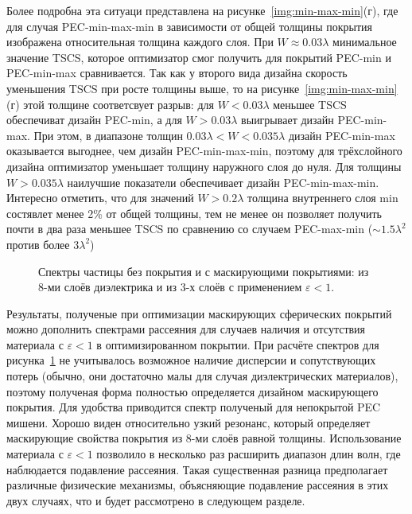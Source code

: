 Более подробна эта ситуаци представлена на
рисунке~\ref{img:min-max-min}(г), где для случая PEC-min-max-min в
зависимости от общей толщины покрытия изображена относительная толщина
каждого слоя. При $W\approx0.03\lambda$ минимальное значение TSCS,
которое оптимизатор смог получить для покрытий PEC-min и PEC-min-max
сравнивается. Так как у второго вида дизайна скорость уменьшения TSCS
при росте толщины выше, то на рисунке~\ref{img:min-max-min}(г) этой
толщине соответсвует разрыв: для $W<0.03\lambda$ меньшее TSCS
обеспечиват дизайн PEC-min, а для $W>0.03\lambda$ выигрывает дизайн
PEC-min-max. При этом, в диапазоне толщин
$0.03\lambda < W < 0.035\lambda$ дизайн PEC-min-max оказывается
выгоднее, чем дизайн PEC-min-max-min, поэтому для трёхслойного дизайна
оптимизатор уменьшает толщину наружного слоя до нуля. Для толщины
$W>0.035\lambda$ наилучшие показатели обеспечивает дизайн
PEC-min-max-min. Интересно отметить, что для значений 
$W>0.2\lambda$ толщина внутреннего слоя min состявлет менее 2\% от
общей толщины, тем не менее он позволяет получить почти в два раза
меньшее TSCS по сравнению со случаем PEC-max-min ($\sim
1.5\lambda^2$ против более $3 \lambda^2$)

\begin{figure}[t]
  \centering
  \caption{ Спектры частицы без покрытия и с маскирующими
    покрытиями: из 8-ми слоёв диэлектрика и из 3-х слоёв с применением
    ${\varepsilon<1}$.\label{img:index07-spectra} 
    }
\end{figure}
Результаты, полученые при оптимизации маскирующих сферических покрытий
можно дополнить спектрами рассеяния для случаев наличия и отсутствия
материала с ${\varepsilon<1}$ в оптимизированном покрытии.  При
расчёте спектров для рисунка~\ref{img:index07-spectra} не учитывалось
возможное наличие дисперсии и сопутствующих потерь (обычно, они
достаточно малы для случая диэлектрических материалов), поэтому
полученая форма полностью определяется дизайном маскирующего
покрытия. Для удобства приводится спектр полученый для непокрытой PEC
мишени.  Хорошо виден относительно узкий резонанс, который определяет
маскирующие свойства покрытия из 8-ми слоёв равной
толщины. Использование материала с ${\varepsilon<1}$ позволило в
несколько раз расширить диапазон длин волн, где наблюдается подавление
рассеяния.  Такая существенная разница предполагает различные
физические механизмы, объясняющие подавление рассеяния в этих двух
случаях, что и будет рассмотрено в следующем разделе.

